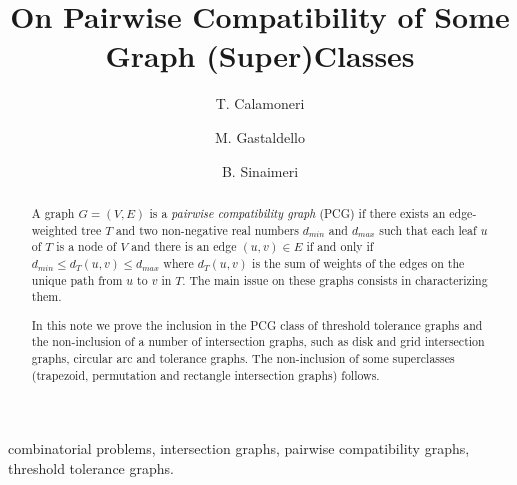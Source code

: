 \documentclass{elsarticle}
\begin{document}
\begin{frontmatter}

\title{On Pairwise Compatibility of Some Graph (Super)Classes}

\author[comp]{T. Calamoneri}

\author[comp,INRIA]{M. Gastaldello}

\author[INRIA]{B. Sinaimeri}

\address[comp]{Department of Computer Science, ``Sapienza'' University of Rome, Italy}
\address[INRIA]{INRIA and Universit\'e de Lyon, Universit\'e Lyon 1, LBBE, CNRS UMR558, France}







\begin{abstract}
A graph $G=(V,E)$ is a {\em pairwise compatibility graph} (PCG) if there exists an edge-weighted tree $T$ and two non-negative real numbers $d_{min}$ and $d_{max}$ such that each leaf $u$ of $T$ is a node of $V$ and there is an edge $(u,v) \in E$ if and only if $d_{min} \leq d_T (u, v) \leq d_{max}$ where $d_T (u, v)$ is the sum of weights of the edges on the unique path from $u$ to $v$ in $T$. 
The main issue on these graphs consists in characterizing them.

In this note we prove the inclusion in the PCG class of threshold tolerance graphs and the non-inclusion of a number of intersection graphs, such as disk and grid intersection graphs, circular arc and tolerance graphs. 
The non-inclusion of some superclasses (trapezoid, permutation and rectangle intersection graphs) follows.
\end{abstract}

\begin{keyword}
combinatorial problems, intersection graphs, pairwise compatibility graphs, threshold tolerance graphs.
\end{keyword}

\end{frontmatter}
\end{document}
